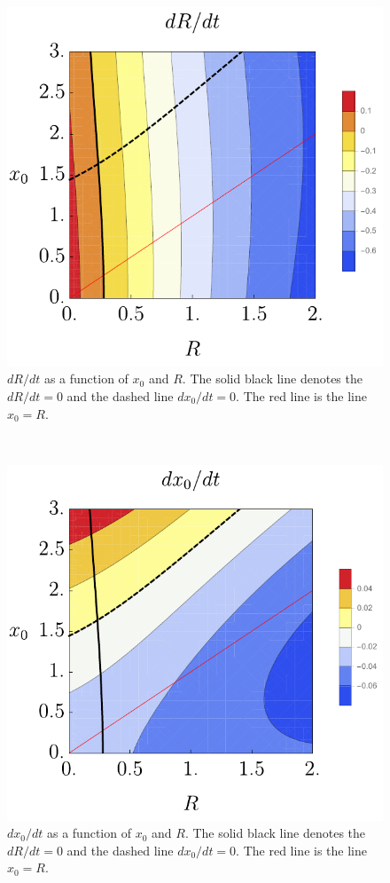 \documentclass{Dissertate}
\let\origfigure\figure
\let\endorigfigure\endfigure
\renewenvironment{figure}[1][2] {
    \expandafter\origfigure\expandafter[H]
} {
    \endorigfigure
}
\begin{document}
\begin{figure}
    \centering
    \begin{subfigure}[t]{0.5\textwidth}
        \centering
        \includegraphics{source/figures/pdf/dRdt.pdf}
        \caption{\(dR/dt\) as a function of \(x_0\) and \(R\). The solid black
line denotes the \(dR/dt=0\) and the dashed line \(dx_0/dt=0\). The red
line is the line \(x_0=R\).\label{fig:drdtdecay}}
    \end{subfigure}%
    ~ 
    \begin{subfigure}[t]{0.5\textwidth}
        \centering
        \includegraphics{source/figures/pdf/dXdt.pdf}
        \caption{\(dx_0/dt\) as a function of \(x_0\) and \(R\). The solid black
line denotes the \(dR/dt=0\) and the dashed line \(dx_0/dt=0\). The red
line is the line \(x_0=R\).\label{fig:dxdtdecay}}
    \end{subfigure}
    \caption{}
\end{figure}
\end{document}
